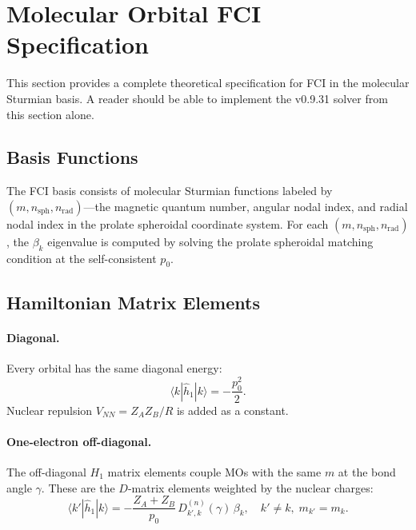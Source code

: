 
\section{Molecular Orbital FCI Specification}
\label{sec:mo_fci}

This section provides a complete theoretical specification for FCI in
the molecular Sturmian basis.  A reader should be able to implement
the v0.9.31 solver from this section alone.

\subsection{Basis Functions}

The FCI basis consists of molecular Sturmian functions labeled by
$(m, n_{\text{sph}}, n_{\text{rad}})$---the magnetic quantum number,
angular nodal index, and radial nodal index in the prolate spheroidal
coordinate system.  For each $(m, n_{\text{sph}}, n_{\text{rad}})$,
the $\beta_k$ eigenvalue is computed by solving the prolate spheroidal
matching condition at the self-consistent $p_0$.

\subsection{Hamiltonian Matrix Elements}

\paragraph{Diagonal.}
Every orbital has the same diagonal energy:
\begin{equation}
\langle k | \hat{h}_1 | k \rangle = -\frac{p_0^2}{2}.
\end{equation}
Nuclear repulsion $V_{NN} = Z_A Z_B / R$ is added as a constant.

\paragraph{One-electron off-diagonal.}
The off-diagonal $H_1$ matrix elements couple MOs with the same $m$
at the bond angle $\gamma$.  These are the $D$-matrix elements
weighted by the nuclear charges:
\begin{equation}
\langle k' | \hat{h}_1 | k \rangle
= -\frac{Z_A + Z_B}{p_0}\, D^{(n)}_{k',k}(\gamma)\,\beta_k,
\quad k' \neq k,\; m_{k'} = m_k.
\end{equation}

